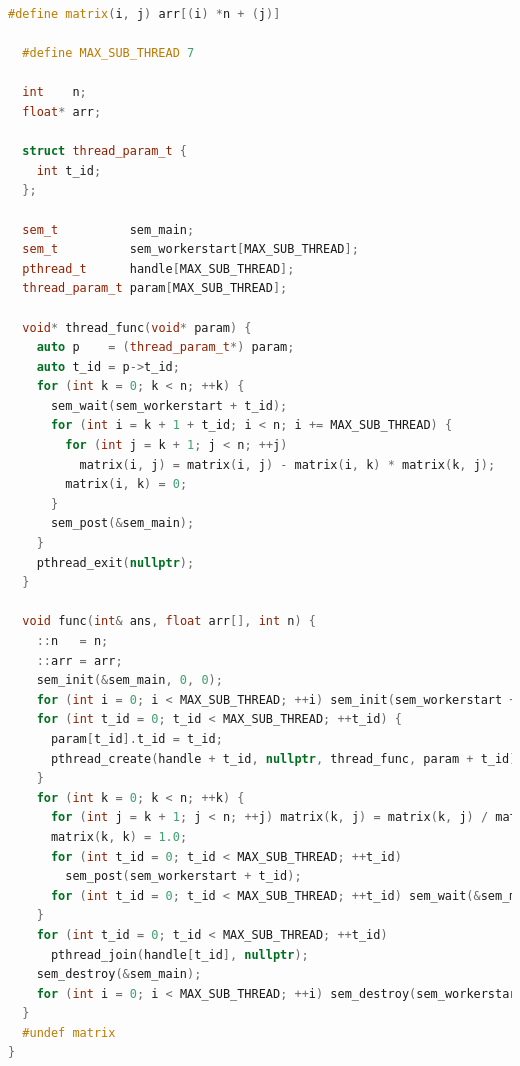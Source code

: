 \documentclass[a4paper]{article}
\begin{document}
\begin{lstlisting}[title=线程池+信号量同步+主线程执行除法,frame=trbl,language={C++}]
  #define matrix(i, j) arr[(i) *n + (j)]

  #define MAX_SUB_THREAD 7
  
  int    n;
  float* arr;
  
  struct thread_param_t {
    int t_id;
  };
  
  sem_t          sem_main;
  sem_t          sem_workerstart[MAX_SUB_THREAD];
  pthread_t      handle[MAX_SUB_THREAD];
  thread_param_t param[MAX_SUB_THREAD];
  
  void* thread_func(void* param) {
    auto p    = (thread_param_t*) param;
    auto t_id = p->t_id;
    for (int k = 0; k < n; ++k) {
      sem_wait(sem_workerstart + t_id);
      for (int i = k + 1 + t_id; i < n; i += MAX_SUB_THREAD) {
        for (int j = k + 1; j < n; ++j)
          matrix(i, j) = matrix(i, j) - matrix(i, k) * matrix(k, j);
        matrix(i, k) = 0;
      }
      sem_post(&sem_main);
    }
    pthread_exit(nullptr);
  }
  
  void func(int& ans, float arr[], int n) {
    ::n   = n;
    ::arr = arr;
    sem_init(&sem_main, 0, 0);
    for (int i = 0; i < MAX_SUB_THREAD; ++i) sem_init(sem_workerstart + i, 0, 0);
    for (int t_id = 0; t_id < MAX_SUB_THREAD; ++t_id) {
      param[t_id].t_id = t_id;
      pthread_create(handle + t_id, nullptr, thread_func, param + t_id);
    }
    for (int k = 0; k < n; ++k) {
      for (int j = k + 1; j < n; ++j) matrix(k, j) = matrix(k, j) / matrix(k, k);
      matrix(k, k) = 1.0;
      for (int t_id = 0; t_id < MAX_SUB_THREAD; ++t_id)
        sem_post(sem_workerstart + t_id);
      for (int t_id = 0; t_id < MAX_SUB_THREAD; ++t_id) sem_wait(&sem_main);
    }
    for (int t_id = 0; t_id < MAX_SUB_THREAD; ++t_id)
      pthread_join(handle[t_id], nullptr);
    sem_destroy(&sem_main);
    for (int i = 0; i < MAX_SUB_THREAD; ++i) sem_destroy(sem_workerstart + i);
  }
  #undef matrix
}
\end{lstlisting}
\end{document}
